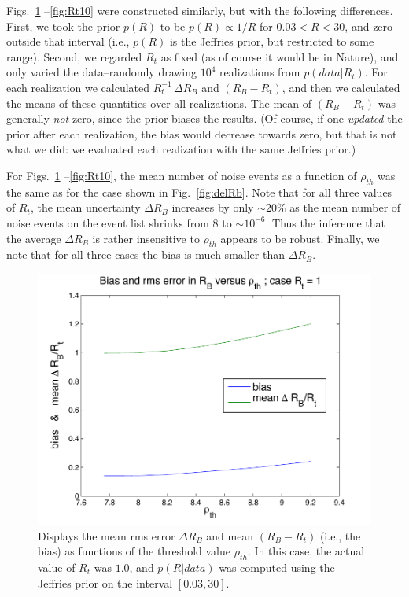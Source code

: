 \documentclass[aps,prd]{revtex4-1}
\begin{document}
Figs.~\ref{fig:Rt1} --\ref{fig:Rt10} were constructed similarly, but with the following differences.  First, we took the prior 
$p(R)$ to be $p(R) \propto 1/R$ for  $0.03 < R < 30$, and zero outside that interval (i.e., $p(R)$ is the Jeffries prior, but restricted to some range).   Second, we regarded $R_t$ as fixed (as of course it would be in Nature), and only varied the data--randomly drawing $10^4$ realizations from $p(data|R_t)$.  For each realization we calculated $R_t^{-1}\,\Delta R_B$ and $(R_B - R_t)$, and then we calculated the means of these quantities over all realizations.  The mean of $(R_B - R_t)$ was generally {\it not} zero, since the
prior biases the results.  (Of course, if one {\it updated} the prior after each realization, the 
bias would decrease towards zero, but that is not what we did: we evaluated each realization with the same Jeffries prior.)   

For Figs.~\ref{fig:Rt1} --\ref{fig:Rt10}, the mean number of noise events as a function of $\rho_{th}$ was the same as for the case shown in Fig.~\ref{fig:delRb}.  Note that for all three values of $R_t$, the mean uncertainty $\Delta R_B$ increases by only $\sim 20\%$  as the mean number of noise events on the event list shrinks from $8$ to $\sim 10^{-6}$. 
Thus the inference that the average $\Delta R_B$ is rather insensitive to  $\rho_{th}$ appears to be robust.
Finally, we note that for all three cases the bias is much smaller than $\Delta R_B$.

\begin{figure}
\includegraphics[width=\columnwidth]{Rt1}
\caption{\label{fig:Rt1} Displays the mean rms error $\Delta R_B$ and mean $(R_B - R_t)$ (i.e., the bias) as functions of the threshold value $\rho_{th}$.  In this case, the actual value of $R_t$ was $1.0$, and $p(R|data)$ was computed using the Jeffries prior on the interval $[0.03,30]$.}
\end{figure} 
\end{document}
